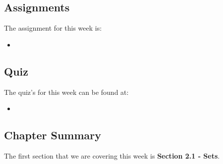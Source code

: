 \subsection{Assignments}

The assignment for this week is:

\begin{itemize}
    \item {}
\end{itemize}

\subsection{Quiz}

The quiz's for this week can be found at:

\begin{itemize}
    \item {}
\end{itemize}

\newpage

\subsection{Chapter Summary}

The first section that we are covering this week is \textbf{Section 2.1 - Sets}.

